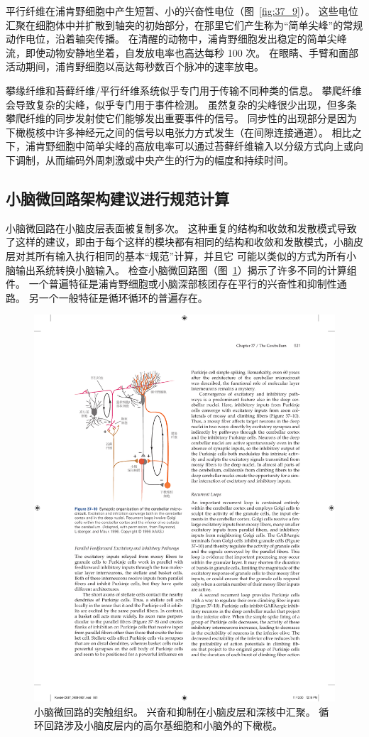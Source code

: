 平行纤维在浦肯野细胞中产生短暂、小的兴奋性电位（图~\ref{fig:37_9}）。
这些电位汇聚在细胞体中并扩散到轴突的初始部分，在那里它们产生称为“简单尖峰”的常规动作电位，沿着轴突传播。
在清醒的动物中，浦肯野细胞发出稳定的简单尖峰流，即使动物安静地坐着，自发放电率也高达每秒 100 次。
在眼睛、手臂和面部活动期间，浦肯野细胞以高达每秒数百个脉冲的速率放电。


攀缘纤维和苔藓纤维/平行纤维系统似乎专门用于传输不同种类的信息。
攀爬纤维会导致复杂的尖峰，似乎专门用于事件检测。
虽然复杂的尖峰很少出现，但多条攀爬纤维的同步发射使它们能够发出重要事件的信号。
同步性的出现部分是因为下橄榄核中许多神经元之间的信号以电张力方式发生（在间隙连接通道）。
相比之下，浦肯野细胞中简单尖峰的高放电率可以通过苔藓纤维输入以分级方式向上或向下调制，从而编码外周刺激或中央产生的行为的幅度和持续时间。



\subsection{小脑微回路架构建议进行规范计算}

小脑微回路在小脑皮层表面被复制多次。
这种重复的结构和收敛和发散模式导致了这样的建议，即由于每个这样的模块都有相同的结构和收敛和发散模式，小脑皮层对其所有输入执行相同的基本“规范”计算，并且它 可能以类似的方式为所有小脑输出系统转换小脑输入。
检查小脑微回路图（图~\ref{fig:37_10}）揭示了许多不同的计算组件。
一个普遍特征是浦肯野细胞或小脑深部核团存在平行的兴奋性和抑制性通路。
另一个一般特征是循环循环的普遍存在。


\begin{figure}[htbp]
	\centering
	\includegraphics[width=0.6\linewidth]{chap37/fig_37_10}
	\caption{小脑微回路的突触组织。
		兴奋和抑制在小脑皮层和深核中汇聚。
		循环回路涉及小脑皮层内的高尔基细胞和小脑外的下橄榄\cite{raymond1996cerebellum}。}
	\label{fig:37_10}
\end{figure}


